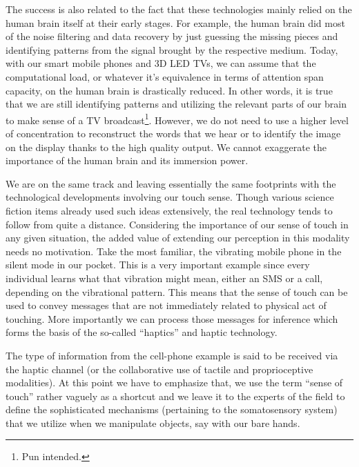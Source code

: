 The success is also related to the fact that these technologies mainly relied on the human brain itself at their early stages. For 
example, the human brain did most of the noise filtering and data recovery by just guessing the missing pieces and identifying patterns 
from the signal brought by the respective medium. Today, with our smart mobile phones and 3D LED TVs, we can assume that the 
computational load, or whatever it's equivalence in terms of attention span capacity, on the human brain is drastically reduced. In other 
words, it is true that we are still identifying patterns and utilizing the relevant parts of our brain to make sense of a TV broadcast\footnote{Pun 
intended.}. However, we do not need to use a higher level of concentration to reconstruct the words that we hear or to identify the image 
on the display thanks to the high quality output. We cannot exaggerate the importance of the human brain and its immersion power. 

We are on the same track and leaving essentially the same footprints with the technological developments involving our touch sense. 
Though various science fiction items already used such ideas extensively, the real technology tends to follow from quite a distance.  
Considering the importance of our sense of touch in any given situation, the added value of extending our perception in this modality 
needs no motivation. Take the most familiar, the vibrating mobile phone in the silent mode in our pocket. This is a very important 
example since every individual learns what that vibration might mean, either an SMS or a call, depending on the vibrational pattern. This 
means that the sense of touch can be used to convey messages that are not immediately related to physical act of touching. More 
importantly we can process those messages for inference which forms the basis of the so-called \enquote{haptics} and haptic technology.


The type of information from the cell-phone example is said to be received via the haptic channel (or the collaborative use of tactile 
and proprioceptive modalities). At this point we have to emphasize that, we use the term \enquote{sense of touch} rather vaguely as a 
shortcut and we leave it to the experts of the field to define the sophisticated mechanisms (pertaining to the somatosensory system) that 
we utilize when we manipulate objects, say with our bare hands. 


